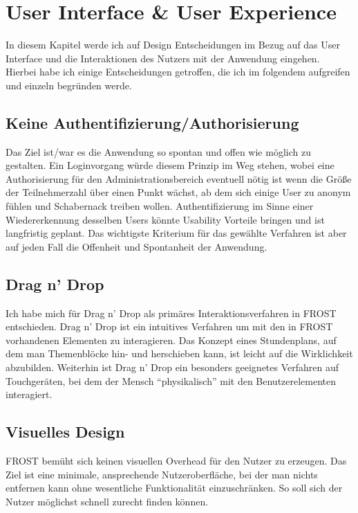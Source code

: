 \chapter{User Interface \& User Experience}
\label{cha:user-interface}
In diesem Kapitel werde ich auf Design Entscheidungen im Bezug auf das User
Interface und die Interaktionen des Nutzers mit der Anwendung eingehen.\\
Hierbei habe ich einige Entscheidungen getroffen, die ich im folgendem
aufgreifen und einzeln begründen werde.

\section{Keine Authentifizierung/Authorisierung}
Das Ziel ist/war es die Anwendung so spontan und offen wie möglich zu gestalten.
Ein Loginvorgang würde diesem Prinzip im Weg stehen, wobei eine Authorisierung
für den Administrationsbereich eventuell nötig ist wenn die Größe der
Teilnehmerzahl über einen Punkt wächst, ab dem sich einige User zu anonym fühlen
und Schabernack treiben wollen.
Authentifizierung im Sinne einer Wiedererkennung desselben Users könnte
Usability Vorteile bringen und ist langfristig geplant. Das wichtigste Kriterium
für das gewählte Verfahren ist aber auf jeden Fall die Offenheit und Spontanheit
der Anwendung.

\section{Drag n' Drop}
Ich habe mich für Drag n' Drop als primäres Interaktionsverfahren in FROST
entschieden. Drag n' Drop ist ein intuitives Verfahren um mit den in FROST
vorhandenen Elementen zu interagieren. Das Konzept eines Stundenplans, auf dem
man Themenblöcke hin- und herschieben kann, ist leicht auf die Wirklichkeit
abzubilden. Weiterhin ist Drag n' Drop ein besonders geeignetes Verfahren auf
Touchgeräten, bei dem der Mensch ``physikalisch'' mit den Benutzerelementen
interagiert.

\section{Visuelles Design}
FROST bemüht sich keinen visuellen Overhead für den Nutzer zu erzeugen. Das Ziel
ist eine minimale, ansprechende Nutzeroberfläche, bei der man nichts entfernen
kann ohne wesentliche Funktionalität einzuschränken. So soll sich der Nutzer
möglichst schnell zurecht finden können.


